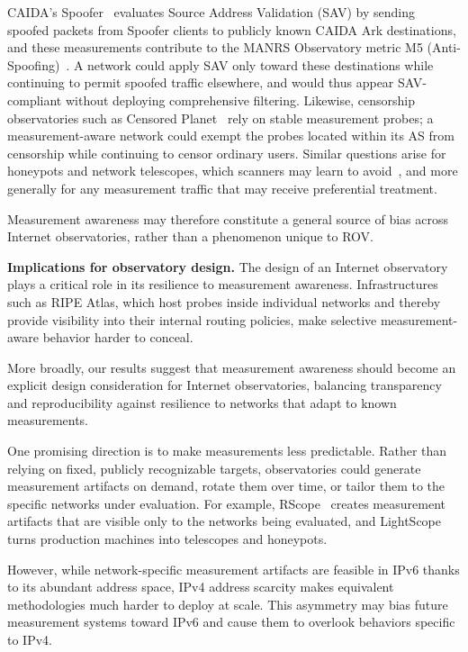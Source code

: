 \documentclass[sigconf, 10pt]{acmart}
\begin{document}
CAIDA's Spoofer~\cite{spoofer} evaluates Source Address Validation (SAV) by sending spoofed packets from Spoofer clients to publicly known CAIDA Ark destinations, and these measurements contribute to the MANRS Observatory metric M5 (Anti-Spoofing)~\cite{manrsmetric}. A network could apply SAV only toward these destinations while continuing to permit spoofed traffic elsewhere, and would thus appear SAV-compliant without deploying comprehensive filtering. Likewise, censorship observatories such as Censored Planet~\cite{censoredplanet} rely on stable measurement probes; a measurement-aware network could exempt the probes located within its AS from censorship while continuing to censor ordinary users. Similar questions arise for honeypots and network telescopes, which scanners may learn to avoid~\cite{lightscope}, and more generally for any measurement traffic that may receive preferential treatment. 

Measurement awareness may therefore constitute a general source of bias across Internet observatories, rather than a phenomenon unique to ROV.


\noindent\textbf{Implications for observatory design.}
The design of an Internet observatory plays a critical role in its resilience to measurement awareness. Infrastructures such as RIPE Atlas, which host probes inside individual networks and thereby provide visibility into their internal routing policies, make selective measurement-aware behavior harder to conceal. 

More broadly, our results suggest that measurement awareness should become an explicit design consideration for Internet observatories, balancing transparency and reproducibility against resilience to networks that adapt to known measurements.

One promising direction is to make measurements less predictable. Rather than relying on fixed, publicly recognizable targets, observatories could generate measurement artifacts on demand, rotate them over time, or tailor them to the specific networks under evaluation. For example, RScope~\cite{rscope} creates measurement artifacts that are visible only to the networks being evaluated, and LightScope~\cite{lightscope} turns production machines into telescopes and honeypots. 

However, while network-specific measurement artifacts are feasible in IPv6 thanks to its abundant address space, IPv4 address scarcity makes equivalent methodologies much harder to deploy at scale. This asymmetry may bias future measurement systems toward IPv6 and cause them to overlook behaviors specific to IPv4. 
\end{document}
